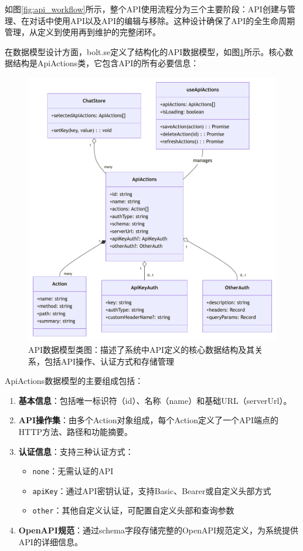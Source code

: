 如图\ref{fig:api_workflow}所示，整个API使用流程分为三个主要阶段：API创建与管理、在对话中使用API以及API的编辑与移除。这种设计确保了API的全生命周期管理，从定义到使用再到维护的完整闭环。

在数据模型设计方面，bolt.se定义了结构化的API数据模型，如图\ref{fig:api_actions_class}所示。核心数据结构是ApiActions类，它包含API的所有必要信息：

\begin{figure}[htbp]
  \centering
  \includegraphics[width=\textwidth]{figures/api_actions_class.pdf}
  \caption{API数据模型类图：描述了系统中API定义的核心数据结构及其关系，包括API操作、认证方式和存储管理}
  \label{fig:api_actions_class}
\end{figure}

ApiActions数据模型的主要组成包括：

\begin{enumerate}
  \item \textbf{基本信息}：包括唯一标识符（id）、名称（name）和基础URL（serverUrl）。
  
  \item \textbf{API操作集}：由多个Action对象组成，每个Action定义了一个API端点的HTTP方法、路径和功能摘要。
  
  \item \textbf{认证信息}：支持三种认证方式：
    \begin{itemize}
      \item \texttt{none}：无需认证的API
      \item \texttt{apiKey}：通过API密钥认证，支持Basic、Bearer或自定义头部方式
      \item \texttt{other}：其他自定义认证，可配置自定义头部和查询参数
    \end{itemize}
  
  \item \textbf{OpenAPI规范}：通过schema字段存储完整的OpenAPI规范定义，为系统提供API的详细信息。
\end{enumerate}

